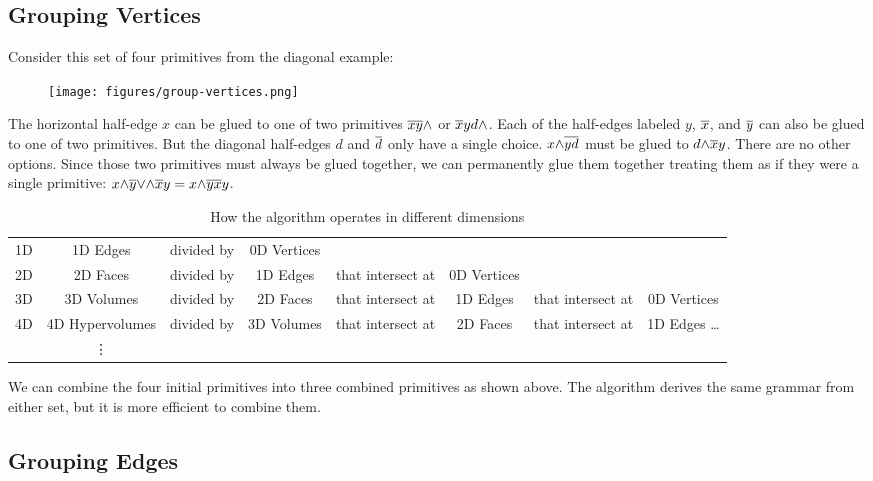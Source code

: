 \documentclass[acmtog]{acmart}
\begin{document}
\subsection{Grouping Vertices}
\label{Grouping Vertices}

Consider this set of four primitives from the diagonal example:

\begin{figure}[H]
\centering
\texttt{[image: figures/group-vertices.png]}
\end{figure}

The horizontal half-edge $x$ can be glued to one of two primitives $\overline{xy} {\wedge}$
or $\overline{x}yd {\wedge}$. Each of the half-edges labeled $y$, $\overline{x}$, and $\overline{y}$ can also be
glued to one of two primitives. But the diagonal half-edges $d$ and $\overline{d}$
only have a single choice. $x {\wedge} \overline{yd}$ must be glued to $d {\wedge} \overline{x}y$. There
are no other options. Since those two primitives must always be glued together,
we can permanently glue them together treating them as if they were a single primitive:
$x {\wedge} \overline{y} {\vee} {\wedge} \overline{x} y = x {\wedge} \overline{yx} y$.

\begin{table*}[tb]
\begin{center}
\begin{tabular} {lccccccc}
1D & 1D Edges        & divided by & 0D Vertices & & & & \\
2D & 2D Faces        & divided by & 1D Edges    & that intersect at & 0D Vertices & & \\
3D & 3D Volumes      & divided by & 2D Faces    & that intersect at & 1D Edges & that intersect at & 0D Vertices \\
4D & 4D Hypervolumes & divided by & 3D Volumes  & that intersect at & 2D Faces    & that intersect at & 1D Edges \ldots \\
& \vdots &&&&&& \\
\end{tabular}
\caption[]{How the algorithm operates in different dimensions}
\label{dimension}
\end{center}
\end{table*}

We can combine the four initial primitives into three combined primitives as 
shown above. The algorithm derives the same grammar from either set, but it 
is more efficient to combine them.

\subsection{Grouping Edges}
\label{Grouping Edges}
\end{document}
